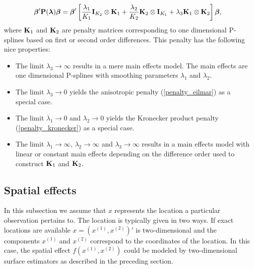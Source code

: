 \documentclass[11pt,a4paper,twoside]{bayesxarticle}
\begin{document}
\begin{enumerate}
\begin{equation}
\label{penalty_comb}
\betavec'\Pvec(\lambdavec)\betavec = \betavec' \left[\frac{\lambda_1}{K_1}
\Ivec_{K_2}\otimes\Kvec_1 + \frac{\lambda_2}{K_2} \Kvec_2\otimes \Ivec_{K_1}+\lambda_3 \Kvec_1 \otimes \Kvec_2   \right] \betavec,
\end{equation}
where $\mathbf{K}_1$ and $\mathbf{K}_2$ are penalty matrices corresponding to one dimensional P-splines based on first or second order differences.
This penalty has the following nice properties:
\begin{itemize}
\item The limit $\lambda_3 \rightarrow \infty$ results in a mere main effects model. The main effects  are one dimensional P-splines with smoothing
parameters $\lambda_1$ and $\lambda_2$.
\item The limit $\lambda_3 \rightarrow 0$ yields the anisotropic penalty (\ref{penalty_eilmar}) as a special case.
\item The limit $\lambda_1 \rightarrow 0$ and $\lambda_2 \rightarrow 0$  yields the Kronecker product penalty
(\ref{penalty_kronecker}) as a special case.
\item The limit $\lambda_1 \rightarrow \infty$, $\lambda_2 \rightarrow \infty$ and $\lambda_3 \rightarrow \infty$ results in a main effects model with
linear or constant main effects depending on the difference order used to construct $\mathbf{K}_1$ and $\mathbf{K}_2$.
\end{itemize}
\end{enumerate}


\subsection{Spatial effects}

In this subsection we assume that $x$ represents the location a
particular observation pertains to. The location is typically given
in two ways. If exact locations are available $x=(x^{(1)},x^{(2)})'$
is two-dimensional and the components  $x^{(1)}$ and $x^{(2)}$
correspond to the coordinates of the location. In this case, the
spatial effect $f(x^{(1)},x^{(2)})$ could be modeled by
two-dimensional surface estimators as described in the preceding
section.
\end{document}
